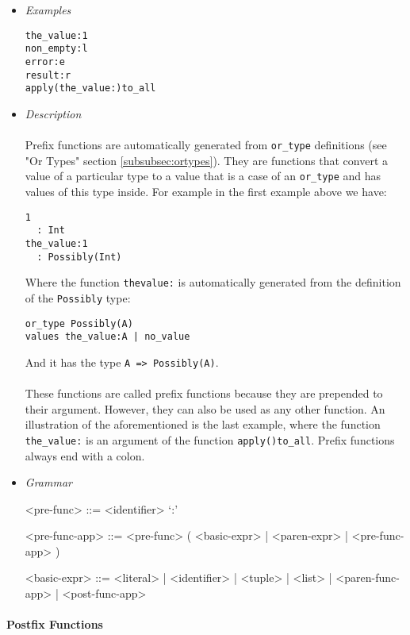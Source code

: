 \documentclass{article}
\begin{document}
\begin{itemize}

\item \textit{Examples}
\begin{verbatim}
the_value:1
non_empty:l
error:e
result:r
apply(the_value:)to_all
\end{verbatim}

\item \textit{Description} \\\\
Prefix functions are automatically generated from \texttt{or_type} definitions
(see "Or Types" section \ref{subsubsec:ortypes}). They are functions that
convert a value of a particular type to a value that is a case of an
\texttt{or_type} and has values of this type inside. For example in the
first example above we have:
\begin{verbatim}
1 
  : Int
the_value:1
  : Possibly(Int)
\end{verbatim}
Where the function \texttt{thevalue:} is automatically generated from the
definition of the \texttt{Possibly} type:
\begin{verbatim}
or_type Possibly(A)
values the_value:A | no_value
\end{verbatim}
And it has the type \texttt{A => Possibly(A)}.
\\\\
These functions are called prefix functions because they are prepended to
their argument. However, they can also be used as any other function.
An illustration of the aforementioned is the last example, where the function
\texttt{the_value:} is an argument of the function \texttt{apply()to_all}.
Prefix functions always end with a colon.

\item \textit{Grammar}
\begin{grammar}
<pre-func> ::= <identifier> `:'

<pre-func-app> ::= <pre-func> ( <basic-expr> | <paren-expr> | <pre-func-app> )

<basic-expr> ::=
<literal> | <identifier> | <tuple> | <list> | <paren-func-app> | <post-func-app> 
\end{grammar}

\end{itemize}

\paragraph{Postfix Functions}
\end{document}
